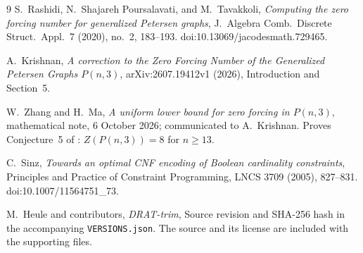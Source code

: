 \documentclass[10pt,a4paper]{article}
\newcommand{\ZF}{Z}
\begin{document}
\begin{thebibliography}{9}
S.~Rashidi, N.~Shajareh Poursalavati, and M.~Tavakkoli,
\emph{Computing the zero forcing number for generalized Petersen graphs},
J.~Algebra Comb.~Discrete Struct.~Appl.~7 (2020), no.~2, 183--193.
doi:10.13069/jacodesmath.729465.

A.~Krishnan, \emph{A correction to the Zero Forcing Number of the
Generalized Petersen Graphs $P(n,3)$},
arXiv:2607.19412v1 (2026),
Introduction and Section~5.

W.~Zhang and H.~Ma, \emph{A uniform lower bound for zero forcing in
$P(n,3)$}, mathematical note, 6 October 2026; communicated to A.~Krishnan.
Proves Conjecture~5 of \cite{Krishnan}: $\ZF(P(n,3))=8$ for $n\ge13$.

C.~Sinz, \emph{Towards an optimal CNF encoding of Boolean cardinality
constraints}, Principles and Practice of Constraint Programming,
LNCS 3709 (2005), 827--831.
doi:10.1007/11564751\_73.

M.~Heule and contributors, \emph{DRAT-trim},
Source revision and SHA-256 hash in the accompanying \texttt{VERSIONS.json}.
The source and its license are included with the supporting files.
\end{thebibliography}
\end{document}
